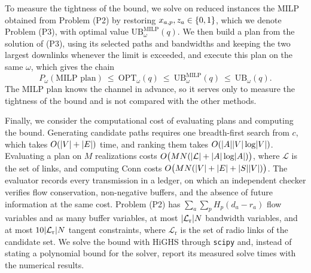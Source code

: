 To measure the tightness of the bound, we solve on reduced instances the MILP obtained from Problem (P2) by restoring $x_{a,p},z_a\in\{0,1\}$, which we denote Problem (P3), with optimal value $\mathrm{UB}^{\mathrm{MILP}}_\omega(q)$. We then build a plan from the solution of (P3), using its selected paths and bandwidths and keeping the two largest downlinks whenever the limit is exceeded, and execute this plan on the same $\omega$, which gives the chain
\begin{equation}
\label{eq:sandwich}
P_\omega(\text{MILP plan})\ \le\ \mathrm{OPT}_\omega(q)\ \le\ \mathrm{UB}^{\mathrm{MILP}}_\omega(q)\ \le\ \mathrm{UB}_\omega(q).
\end{equation}
The MILP plan knows the channel in advance, so it serves only to measure the tightness of the bound and is not compared with the other methods.

\label{sec:complexity}
Finally, we consider the computational cost of evaluating plans and computing the bound. Generating candidate paths requires one breadth-first search from $c$, which takes $O(\lvert V\rvert+\lvert E\rvert)$ time, and ranking them takes $O(\lvert A\rvert\lvert V\rvert\log\lvert V\rvert)$. Evaluating a plan on $M$ realizations costs $O\bigl(MN(\lvert\mathcal L\rvert+\lvert A\rvert\log\lvert A\rvert)\bigr)$, where $\mathcal L$ is the set of links, and computing $\mathrm{Conn}$ costs $O\bigl(MN(\lvert V\rvert+\lvert E\rvert+\lvert S\rvert\lvert V\rvert)\bigr)$. The evaluator records every transmission in a ledger, on which an independent checker verifies flow conservation, non-negative buffers, and the absence of future information at the same cost. Problem (P2) has $\sum_a\sum_p H_p(d_a-r_a)$ flow variables and as many buffer variables, at most $\lvert\mathcal L_{\mathrm{r}}\rvert N$ bandwidth variables, and at most $10\lvert\mathcal L_{\mathrm{r}}\rvert N$ tangent constraints, where $\mathcal L_{\mathrm{r}}$ is the set of radio links of the candidate set. We solve the bound with HiGHS through \texttt{scipy} and, instead of stating a polynomial bound for the solver, report its measured solve times with the numerical results.
